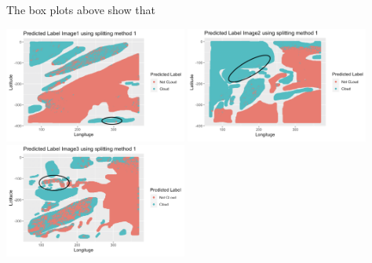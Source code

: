 \documentclass[11pt]{article}
\begin{document}
The box plots above show that 

\includegraphics[width = 6cm]{4(d)image1}
\includegraphics[width = 6cm]{4(d)image2}
\includegraphics[width = 6cm]{4(d)image3}
\end{document}
